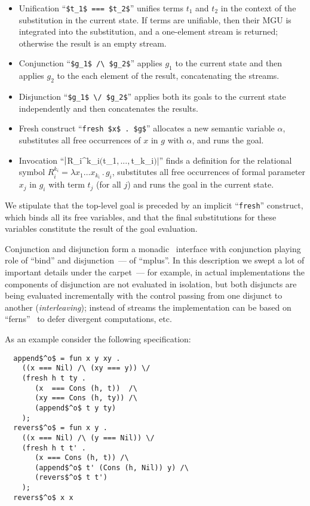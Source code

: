\begin{itemize}
\item Unification ``\lstinline|$t_1$ === $t_2$|'' unifies terms $t_1$ and $t_2$ in the context of the substitution in the current state. If terms are unifiable,
  then their MGU is integrated into the substitution, and a one-element stream is returned; otherwise the result is an empty stream.
\item Conjunction ``\lstinline|$g_1$ /\ $g_2$|'' applies $g_1$ to the current state and then applies $g_2$ to the each element of the result, concatenating
  the streams.
\item Disjunction ``\lstinline|$g_1$ \/ $g_2$|'' applies both its goals to the current state independently and then concatenates the results.
\item Fresh construct ``\lstinline|fresh $x$ . $g$|'' allocates a new semantic variable $\alpha$, substitutes all free occurrences of $x$ in $g$ with $\alpha$, and
  runs the goal.
\item Invocation ``$\lstinline|$R_i^{k_i}$ ($t_1$,...,$t_{k_i}$)|$'' finds a definition for the relational symbol $R_i^{k_i}=\lambda x_1\dots x_{k_i}\,.\,g_i$, substitutes
  all free occurrences of formal parameter $x_j$ in $g_i$ with term $t_j$ (for all $j$) and runs the goal in the current state.
\end{itemize}

We stipulate that the top-level goal is preceded by an implicit ``\lstinline|fresh|'' construct, which binds all its free variables, and that the final substitutions
for these variables constitute the result of the goal evaluation.

Conjunction and disjunction form a monadic~\cite{Monads} interface with conjunction playing role of ``bind'' and disjunction~--- of ``mplus''. In this description
we swept a lot of important details under the carpet~--- for example, in actual implementations the components of disjunction are not evaluated in isolation, but
both disjuncts are being evaluated incrementally with the control passing from one disjunct to another (\emph{interleaving}); instead of streams the implementation
can be based on ``ferns''~\cite{BottomAvoiding} to defer divergent computations, etc. 

As an example consider the following specification:

\begin{lstlisting}
  append$^o$ = fun x y xy .
    ((x === Nil) /\ (xy === y)) \/
    (fresh h t ty .
       (x  === Cons (h, t))  /\
       (xy === Cons (h, ty)) /\
       (append$^o$ t y ty)
    );
  revers$^o$ = fun x y .
    ((x === Nil) /\ (y === Nil)) \/
    (fresh h t t' .
       (x === Cons (h, t)) /\
       (append$^o$ t' (Cons (h, Nil)) y) /\
       (revers$^o$ t t') 
    );
  revers$^o$ x x
\end{lstlisting}

